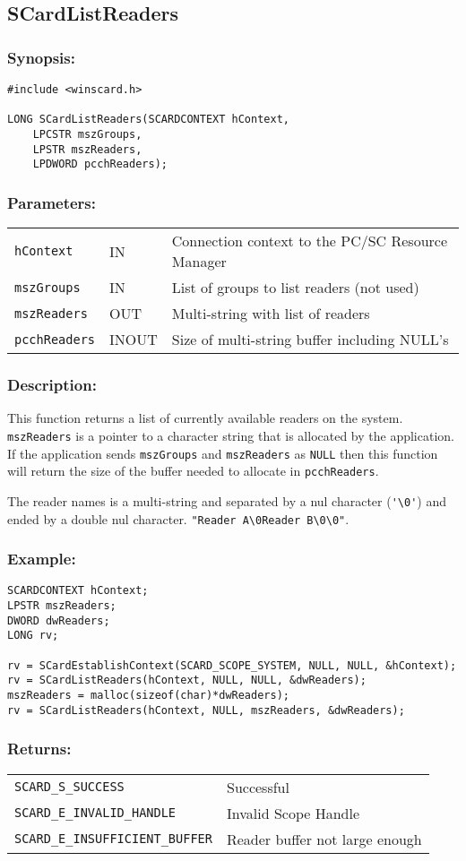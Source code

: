 \documentclass[a4paper,12pt]{article}
\newcommand{\synopsis}{\subsubsection{Synopsis:}}
\newcommand{\parameters}{\subsubsection{Parameters:}}
\newcommand{\desc}{\subsubsection{Description:}}
\newcommand{\example}{\subsubsection{Example:}}
\newcommand{\returns}{\subsubsection{Returns:}}
\begin{document}
\subsection{SCardListReaders}

\synopsis
\begin{verbatim}
#include <winscard.h>

LONG SCardListReaders(SCARDCONTEXT hContext,
    LPCSTR mszGroups,
    LPSTR mszReaders,
    LPDWORD pcchReaders);
\end{verbatim}

\parameters

\begin{tabular}{lll}
\texttt{hContext} & IN & Connection context to the PC/SC Resource Manager\\
\texttt{mszGroups} & IN & List of groups to list readers (not used)\\
\texttt{mszReaders} & OUT & Multi-string with list of readers\\
\texttt{pcchReaders} & INOUT & Size of multi-string buffer including NULL's
\end{tabular}

\desc

This function returns a list of currently available readers on the
system. \texttt{mszReaders} is a pointer to a character string that is
allocated by the application. If the application sends
\texttt{mszGroups} and \texttt{mszReaders} as \texttt{NULL} then this
function will return the size of the buffer needed to allocate in
\texttt{pcchReaders}.

The reader names is a multi-string and separated by a nul character
(\verb+'\0'+) and ended by a double nul character.
\verb+"Reader A\0Reader B\0\0"+.

\example
\begin{verbatim}
SCARDCONTEXT hContext;
LPSTR mszReaders;
DWORD dwReaders;
LONG rv;

rv = SCardEstablishContext(SCARD_SCOPE_SYSTEM, NULL, NULL, &hContext);
rv = SCardListReaders(hContext, NULL, NULL, &dwReaders);
mszReaders = malloc(sizeof(char)*dwReaders);
rv = SCardListReaders(hContext, NULL, mszReaders, &dwReaders);
\end{verbatim}

\returns

\begin{tabular}{ll}
\texttt{SCARD\_S\_SUCCESS} & Successful \\
\texttt{SCARD\_E\_INVALID\_HANDLE} & Invalid Scope Handle\\
\texttt{SCARD\_E\_INSUFFICIENT\_BUFFER} & Reader buffer not large enough
\end{tabular}
\end{document}
